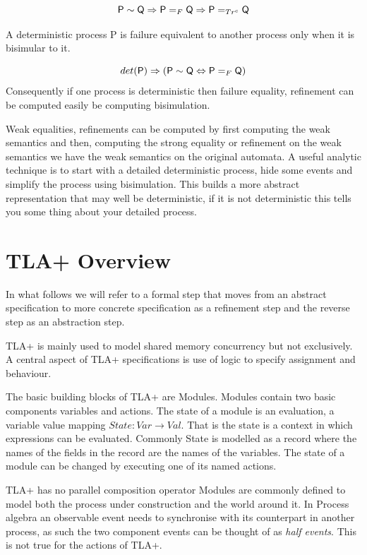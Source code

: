 \documentclass[]{article}
\begin{document}
 \[{\sf P}\sim {\sf Q} \Rightarrow {\sf P}=_F {\sf Q} \Rightarrow {\sf P}=_{Tr^c} {\sf Q} \]
 
\noindent  A deterministic process {\sf P} is failure equivalent to another process only when it is bisimular to it.
 
 \[det({\sf P}) \Rightarrow ({\sf P}\sim {\sf Q} \Leftrightarrow {\sf P}=_F {\sf Q} ) \]
Consequently if one process is deterministic then failure equality, refinement can be computed easily be computing bisimulation.

Weak equalities, refinements  can be computed  by first computing the weak semantics and then, computing the strong equality or  refinement
 on the weak semantics we have the weak semantics on the original automata. A useful analytic technique is to  start with a detailed deterministic process,  hide some events and simplify the process using bisimulation.   This builds a more abstract representation that may well be deterministic, if it is not deterministic this tells you some thing about your detailed process.
 
 
 

\section{TLA+  Overview}
In what follows we will refer to a formal step that moves from an abstract specification to  more concrete specification  as a refinement step and the reverse step as an abstraction step.

TLA+ is mainly used to model shared memory concurrency but not exclusively. A central aspect of TLA+ specifications is use of logic to specify assignment and behaviour.

The basic building blocks of TLA+ are  Modules. Modules contain two basic components variables and actions. The state of a module is an evaluation, a variable value mapping $State:Var\rightarrow Val$. That is the state is a context in which expressions can be evaluated. Commonly State is modelled as a record where the names of the fields in the record are the names of the variables. The state of a module can be changed by executing one of its named actions.

TLA+ has no parallel composition operator Modules are commonly defined to model both the process under construction and the world around it.  In Process algebra an observable event needs to synchronise with its counterpart in another process, as such the two component events can be thought of as \emph{half events}. This is not true for the actions of  TLA+.
\end{document}
